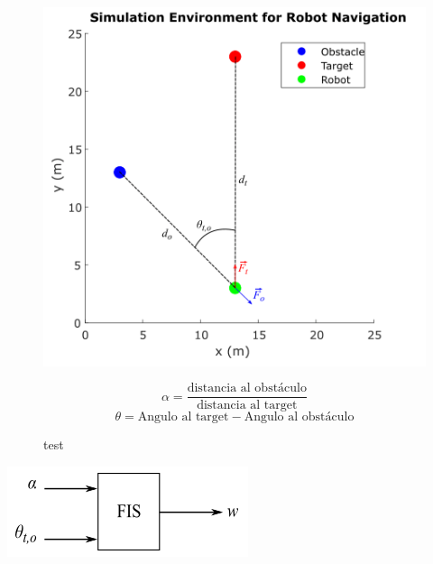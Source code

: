 \begin{figure}[ht]
\begin{minipage}[t]{0.5\linewidth}
\centering
\includegraphics[width=0.9\linewidth, valign=t]{Tesis/Capitulos/04_CAPITULO_2/img/MySimAvoidObs1_env.png}
\caption{test}
\label{GIS_Mapping_Software}
\end{minipage}%
\begin{minipage}[t]{0.5\linewidth}
\begin{equation}\alpha = \frac{\text{distancia al obstáculo}}{\text{distancia al target}} \end{equation}
\begin{equation}\theta = \text{Angulo al target} - \text{Angulo al obstáculo}\end{equation}
\end{minipage}
\end{figure}

\begin{center}
    \includegraphics[scale=0.6]{Tesis/Capitulos/04_CAPITULO_2/img/MySimAvoidObs1_system.png}
\end{center}

